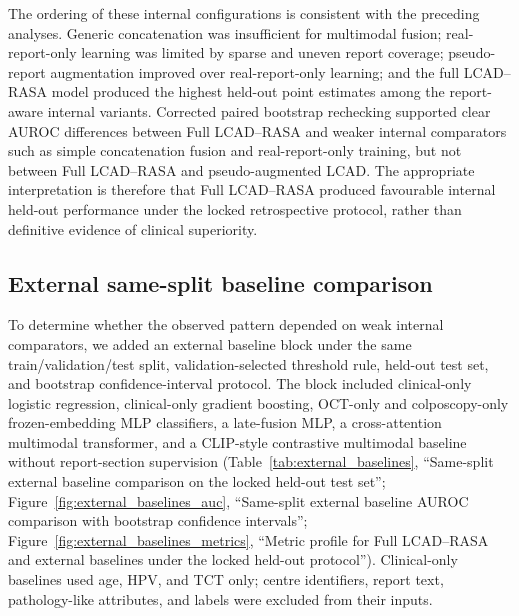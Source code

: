 The ordering of these internal configurations is consistent with the preceding analyses. Generic concatenation was insufficient for multimodal fusion; real-report-only learning was limited by sparse and uneven report coverage; pseudo-report augmentation improved over real-report-only learning; and the full LCAD--RASA model produced the highest held-out point estimates among the report-aware internal variants. Corrected paired bootstrap rechecking supported clear AUROC differences between Full LCAD--RASA and weaker internal comparators such as simple concatenation fusion and real-report-only training, but not between Full LCAD--RASA and pseudo-augmented LCAD. The appropriate interpretation is therefore that Full LCAD--RASA produced favourable internal held-out performance under the locked retrospective protocol, rather than definitive evidence of clinical superiority.

\subsection{External same-split baseline comparison}
\label{subsec:external_baseline_results}

To determine whether the observed pattern depended on weak internal comparators, we added an external baseline block under the same train/validation/test split, validation-selected threshold rule, held-out test set, and bootstrap confidence-interval protocol. The block included clinical-only logistic regression, clinical-only gradient boosting, OCT-only and colposcopy-only frozen-embedding MLP classifiers, a late-fusion MLP, a cross-attention multimodal transformer, and a CLIP-style contrastive multimodal baseline without report-section supervision (Table~\ref{tab:external_baselines}, ``Same-split external baseline comparison on the locked held-out test set''; Figure~\ref{fig:external_baselines_auc}, ``Same-split external baseline AUROC comparison with bootstrap confidence intervals''; Figure~\ref{fig:external_baselines_metrics}, ``Metric profile for Full LCAD--RASA and external baselines under the locked held-out protocol''). Clinical-only baselines used age, HPV, and TCT only; centre identifiers, report text, pathology-like attributes, and labels were excluded from their inputs.

